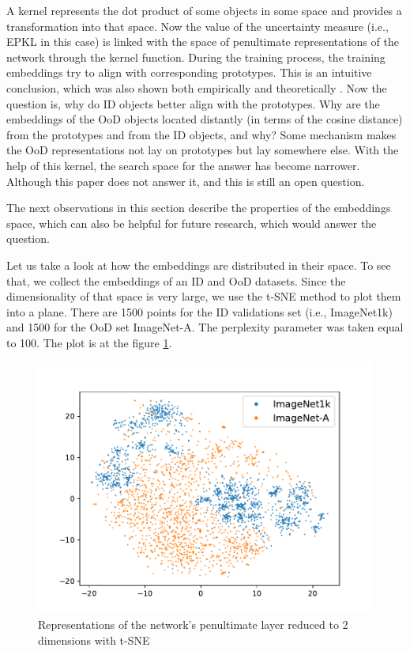\documentclass{article}
\begin{document}
A kernel represents the dot product of some objects in some space and provides a transformation into that space.
Now the value of the uncertainty measure (i.e., EPKL in this case) is linked with the space of penultimate representations of the network through the kernel function.
During the training process, the training embeddings try to align with corresponding prototypes.
This is an intuitive conclusion, which was also shown both empirically and theoretically \cite{neural_collapse}.
Now the question is, why do ID objects better align with the prototypes.
Why are the embeddings of the OoD objects located distantly (in terms of the cosine distance) from the prototypes and from the ID objects, and why?
Some mechanism makes the OoD representations not lay on prototypes but lay somewhere else.
With the help of this kernel, the search space for the answer has become narrower.
Although this paper does not answer it, and this is still an open question.

The next observations in this section describe the properties of the embeddings space, which can also be helpful for future research, which would answer the question.

Let us take a look at how the embeddings are distributed in their space.
To see that, we collect the embeddings of an ID and OoD datasets.
Since the dimensionality of that space is very large, we use the t-SNE method \cite{tsne} to plot them into a plane.
There are 1500 points for the ID validations set (i.e., ImageNet1k) and 1500 for the OoD set ImageNet-A.
The perplexity parameter was taken equal to 100.
The plot is at the figure \ref{fig:tsne}.

\begin{figure}[H]
\caption{Representations of the network's penultimate layer reduced to 2 dimensions with t-SNE}
\label{fig:tsne}
\centering
\includegraphics[scale=0.5]{tsne_1k_A.pdf}
\end{figure}
\end{document}
